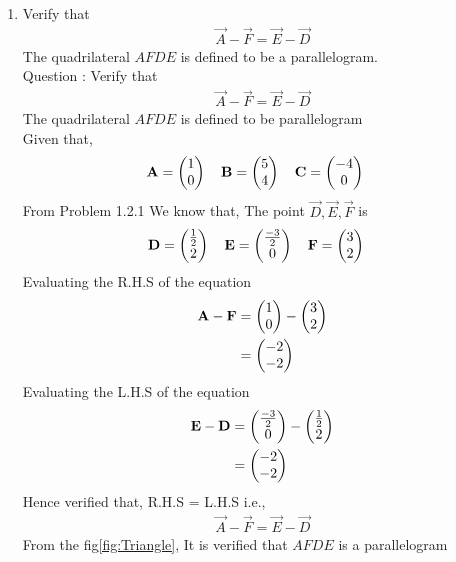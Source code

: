 \documentclass[11pt]{book}
\begin{document}
\begin{enumerate}[label=\thesection.\arabic*.,ref=\thesection.\theenumi]
\item Verify that 
		\begin{align}
\vec{A}-\vec{F}=\vec{E}-\vec{D}
		\end{align}
The quadrilateral $AFDE$ is defined to be a parallelogram.\\
Question : Verify that 
\begin{align}
	\vec{A}-\vec{F} = \vec{E}-\vec{D}
\end{align}
The quadrilateral $AFDE$ is defined to be parallelogram
\\ \solution 
Given that,
\begin{align}
    \mathbf{A} = \begin{pmatrix}1\\0\end{pmatrix}
    \quad
    \mathbf{B} &= \begin{pmatrix}5\\4\end{pmatrix}
    \quad
    \mathbf{C} = \begin{pmatrix}-4\\0\end{pmatrix}
\end{align}
From Problem 1.2.1 We know that, The point $\vec{D},\vec{E},\vec{F}$ is 
\begin{align}
    \mathbf{D} = \begin{pmatrix}\frac{1}{2}\\ 2 \end{pmatrix}
    \quad
    \mathbf{E} &= \begin{pmatrix}\frac{-3}{2}\\0\end{pmatrix}
    \quad
    \mathbf{F} = \begin{pmatrix}3\\ 2\end{pmatrix}
\end{align}
Evaluating the R.H.S of the equation
\begin{align}
    \mathbf{A}-\mathbf{F}&=\begin{pmatrix}1\\0\end{pmatrix}-\begin{pmatrix}3\\ 2 \end{pmatrix}\\
    &=\begin{pmatrix} -2 \\ -2 \end{pmatrix}
\end{align} 
Evaluating the L.H.S of the equation
\begin{align}
    \mathbf{E}-\mathbf{D}&=\begin{pmatrix}\frac{-3}{2}\\0\end{pmatrix}-\begin{pmatrix}\frac{1}{2}\\ 2 \end{pmatrix}\\
    &=\begin{pmatrix}-2 \\ -2 \end{pmatrix}
\end{align}
Hence verified that, R.H.S = L.H.S i.e.,
\begin{align}
	\vec{A}-\vec{F} = \vec{E}-\vec{D}
\end{align}
From the fig\ref{fig:Triangle}, It is verified that $AFDE$ is a parallelogram
\begin{figure}
\centering

\end{figure}
\end{enumerate}
\end{document}
